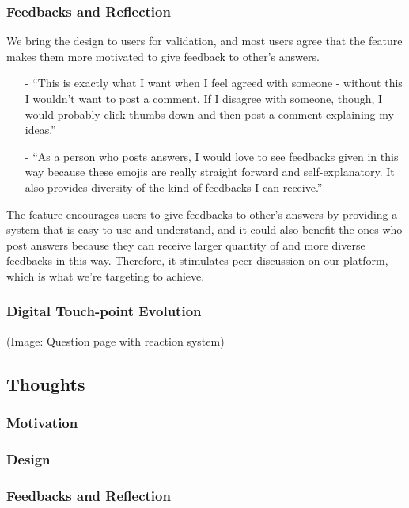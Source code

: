 \documentclass[a4paper]{article}
\begin{document}
    \subsubsection*{Feedbacks and Reflection}
    \noindent We bring the design to users for validation, and most users agree that the feature makes them more motivated to give feedback to other's answers.
    \begin{itemize}
        \item[-] ``This is exactly what I want when I feel agreed with someone - without this I wouldn't want to post a comment.
                   If I disagree with someone, though, I would probably click thumbs down and then post a comment explaining my ideas.''
        \item[-] ``As a person who posts answers, I would love to see feedbacks given in this way because these emojis are really straight forward and self-explanatory.
                   It also provides diversity of the kind of feedbacks I can receive.''
    \end{itemize}

    The feature encourages users to give feedbacks to other's answers by providing a system that is easy to use and understand,
    and it could also benefit the ones who post answers because they can receive larger quantity of and more diverse feedbacks in this way.
    Therefore, it stimulates peer discussion on our platform, which is what we're targeting to achieve.

    \subsubsection*{Digital Touch-point Evolution}
    (Image: Question page with reaction system)

    \subsection*{Thoughts}

    \iffalse
    \subsubsection*{Motivation}
    \subsubsection*{Design}
    \subsubsection*{Feedbacks and Reflection}
\end{document}
